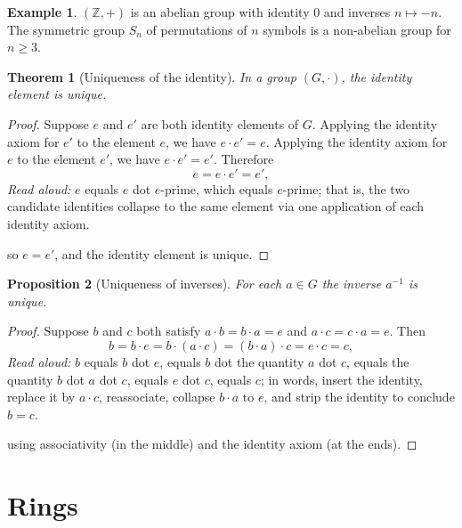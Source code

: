 \documentclass[11pt]{article}
\newtheorem{theorem}{Theorem}
\newtheorem{proposition}[theorem]{Proposition}
\theoremstyle{definition}
\newtheorem{example}{Example}
\begin{document}
\begin{example}
$(\mathbb{Z}, +)$ is an abelian group with identity $0$ and inverses
$n \mapsto -n$. The symmetric group $S_n$ of permutations of $n$ symbols is a
non-abelian group for $n \ge 3$.
\end{example}

\begin{theorem}[Uniqueness of the identity]
\label{thm:identity-unique}
In a group $(G, \cdot)$, the identity element is unique.
\end{theorem}

\begin{proof}
Suppose $e$ and $e'$ are both identity elements of $G$. Applying the identity
axiom for $e'$ to the element $e$, we have $e \cdot e' = e$. Applying the
identity axiom for $e$ to the element $e'$, we have $e \cdot e' = e'$.
Therefore
\[
  e = e \cdot e' = e',
\]
\emph{Read aloud:} $e$ equals $e$ dot $e$-prime, which equals $e$-prime; that
is, the two candidate identities collapse to the same element via one
application of each identity axiom.

so $e = e'$, and the identity element is unique.
\end{proof}

\begin{proposition}[Uniqueness of inverses]
For each $a \in G$ the inverse $a^{-1}$ is unique.
\end{proposition}

\begin{proof}
Suppose $b$ and $c$ both satisfy $a \cdot b = b \cdot a = e$ and
$a \cdot c = c \cdot a = e$. Then
\[
  b = b \cdot e = b \cdot (a \cdot c) = (b \cdot a) \cdot c = e \cdot c = c,
\]
\emph{Read aloud:} $b$ equals $b$ dot $e$, equals $b$ dot the quantity $a$ dot
$c$, equals the quantity $b$ dot $a$ dot $c$, equals $e$ dot $c$, equals $c$;
in words, insert the identity, replace it by $a \cdot c$, reassociate, collapse
$b \cdot a$ to $e$, and strip the identity to conclude $b = c$.

using associativity (in the middle) and the identity axiom (at the ends).
\end{proof}

\section{Rings}
\end{document}
